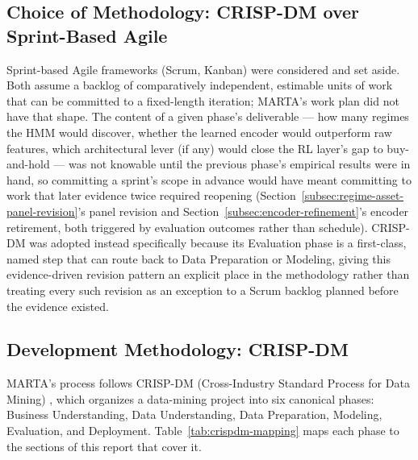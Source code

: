 \subsection{Choice of Methodology: CRISP-DM over Sprint-Based Agile}
\label{subsec:methodology-comparison}

Sprint-based Agile frameworks (Scrum, Kanban) were considered and set aside. Both assume a backlog of comparatively independent, estimable units of work that can be committed to a fixed-length iteration; MARTA's work plan did not have that shape. The content of a given phase's deliverable --- how many regimes the HMM would discover, whether the learned encoder would outperform raw features, which architectural lever (if any) would close the RL layer's gap to buy-and-hold --- was not knowable until the previous phase's empirical results were in hand, so committing a sprint's scope in advance would have meant committing to work that later evidence twice required reopening (Section~\ref{subsec:regime-asset-panel-revision}'s panel revision and Section~\ref{subsec:encoder-refinement}'s encoder retirement, both triggered by evaluation outcomes rather than schedule). CRISP-DM was adopted instead specifically because its Evaluation phase is a first-class, named step that can route back to Data Preparation or Modeling, giving this evidence-driven revision pattern an explicit place in the methodology rather than treating every such revision as an exception to a Scrum backlog planned before the evidence existed.

\subsection{Development Methodology: CRISP-DM}
\label{subsec:crispdm-methodology}

MARTA's process follows CRISP-DM (Cross-Industry Standard Process for Data Mining) \cite{crispdm2000}, which organizes a data-mining project into six canonical phases: Business Understanding, Data Understanding, Data Preparation, Modeling, Evaluation, and Deployment. Table~\ref{tab:crispdm-mapping} maps each phase to the sections of this report that cover it.

